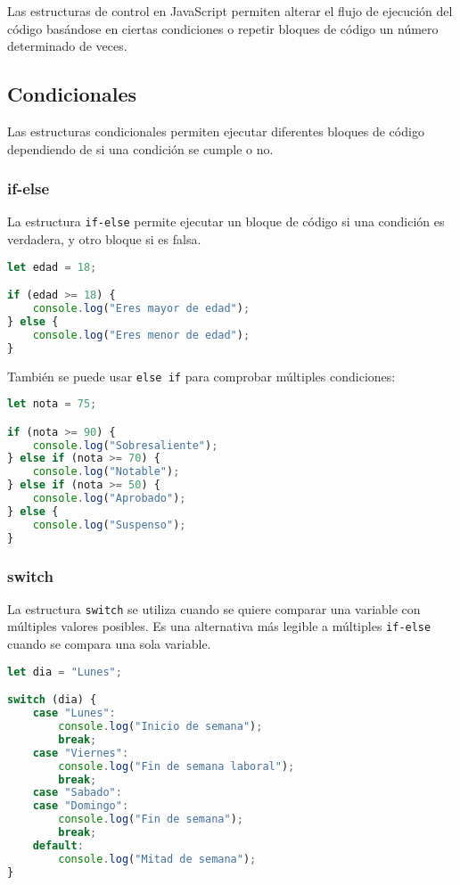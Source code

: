 \documentclass{book}
\begin{document}
Las estructuras de control en JavaScript permiten alterar el flujo de ejecución del código basándose en ciertas condiciones o repetir bloques de código un número determinado de veces.

\subsection{Condicionales}

Las estructuras condicionales permiten ejecutar diferentes bloques de código dependiendo de si una condición se cumple o no.

\subsubsection{if-else}
La estructura \texttt{if-else} permite ejecutar un bloque de código si una condición es verdadera, y otro bloque si es falsa.

\begin{lstlisting}[language=JavaScript]
let edad = 18;

if (edad >= 18) {
    console.log("Eres mayor de edad");
} else {
    console.log("Eres menor de edad");
}
\end{lstlisting}

También se puede usar \texttt{else if} para comprobar múltiples condiciones:

\begin{lstlisting}[language=JavaScript]
let nota = 75;

if (nota >= 90) {
    console.log("Sobresaliente");
} else if (nota >= 70) {
    console.log("Notable");
} else if (nota >= 50) {
    console.log("Aprobado");
} else {
    console.log("Suspenso");
}
\end{lstlisting}

\subsubsection{switch}
La estructura \texttt{switch} se utiliza cuando se quiere comparar una variable con múltiples valores posibles. Es una alternativa más legible a múltiples \texttt{if-else} cuando se compara una sola variable.

\begin{lstlisting}[language=JavaScript]
let dia = "Lunes";

switch (dia) {
    case "Lunes":
        console.log("Inicio de semana");
        break;
    case "Viernes":
        console.log("Fin de semana laboral");
        break;
    case "Sabado":
    case "Domingo":
        console.log("Fin de semana");
        break;
    default:
        console.log("Mitad de semana");
}
\end{lstlisting}
\end{document}
